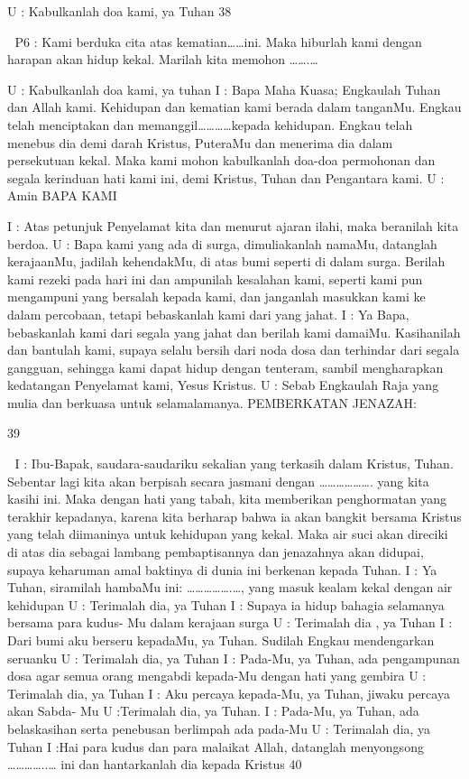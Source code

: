 \documentclass[10pt,a5paper,fancyhdr]{memoir}
\begin{document}
U : Kabulkanlah doa kami, ya Tuhan 
38 



P6 : Kami berduka cita atas kematian……ini. Maka hiburlah kami 
dengan harapan akan hidup kekal. Marilah kita memohon …….… 

U : Kabulkanlah doa kami, ya tuhan 
I : Bapa Maha Kuasa; Engkaulah Tuhan dan Allah kami. Kehidupan 
dan kematian kami berada dalam tanganMu. Engkau telah 
menciptakan dan memanggil…………kepada kehidupan. Engkau 
telah menebus dia demi darah Kristus, PuteraMu dan menerima dia 
dalam persekutuan kekal. Maka kami mohon kabulkanlah doa-doa 
permohonan dan segala kerinduan hati kami ini, demi Kristus, Tuhan 
dan Pengantara kami. 
U : Amin 
BAPA KAMI 

I : Atas petunjuk Penyelamat kita dan menurut ajaran ilahi, maka 
beranilah kita berdoa. 
U : Bapa kami yang ada di surga, dimuliakanlah namaMu, datanglah 
kerajaanMu, jadilah kehendakMu, di atas bumi seperti di dalam 
surga. Berilah kami rezeki pada hari ini dan ampunilah kesalahan 
kami, seperti kami pun mengampuni yang bersalah kepada kami, dan 
janganlah masukkan kami ke dalam percobaan, tetapi bebaskanlah 
kami dari yang jahat. 
I : Ya Bapa, bebaskanlah kami dari segala yang jahat dan berilah 
kami damaiMu. Kasihanilah dan bantulah kami, supaya selalu bersih 
dari noda dosa dan terhindar dari segala gangguan, sehingga kami 
dapat hidup dengan tenteram, sambil mengharapkan kedatangan 
Penyelamat kami, Yesus Kristus. 
U : Sebab Engkaulah Raja yang mulia dan berkuasa untuk selamalamanya. 
PEMBERKATAN JENAZAH: 

39 



I : Ibu-Bapak, saudara-saudariku sekalian yang terkasih dalam 
Kristus, Tuhan. Sebentar lagi kita akan berpisah secara jasmani 
dengan ………………. yang kita kasihi ini. Maka dengan hati yang 
tabah, kita memberikan penghormatan yang terakhir kepadanya, 
karena kita berharap bahwa ia akan bangkit bersama Kristus yang 
telah diimaninya untuk kehidupan yang kekal. Maka air suci akan 
direciki di atas dia sebagai lambang pembaptisannya dan jenazahnya 
akan didupai, supaya keharuman amal baktinya di dunia ini berkenan 
kepada Tuhan. 
I : Ya Tuhan, siramilah hambaMu ini: …………….…, yang masuk 
kealam kekal dengan air kehidupan 
U : Terimalah dia, ya Tuhan 
I : Supaya ia hidup bahagia selamanya bersama para kudus-
Mu dalam kerajaan surga 
U : Terimalah dia , ya Tuhan 
I : Dari bumi aku berseru kepadaMu, ya Tuhan. Sudilah Engkau 
mendengarkan seruanku 
U : Terimalah dia, ya Tuhan 
I : Pada-Mu, ya Tuhan, ada pengampunan dosa agar semua orang 
mengabdi kepada-Mu dengan hati yang gembira 
U : Terimalah dia, ya Tuhan 
I : Aku percaya kepada-Mu, ya Tuhan, jiwaku percaya akan Sabda-
Mu 
U :Terimalah dia, ya Tuhan. 
I : Pada-Mu, ya Tuhan, ada belaskasihan serta penebusan berlimpah 
ada pada-Mu 
U : Terimalah dia, ya Tuhan 
I :Hai para kudus dan para malaikat Allah, datanglah menyongsong 
…………..… ini dan hantarkanlah dia kepada Kristus 
40 
\end{document}

